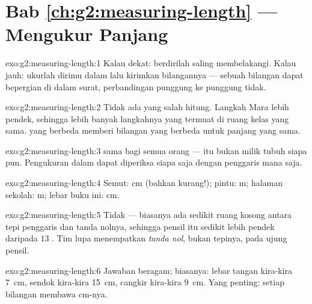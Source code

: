 \section*{Bab \ref{ch:g2:measuring-length} --- Mengukur Panjang}

\begin{solution}{exo:g2:measuring-length:1}
Kalau dekat: berdirilah saling membelakangi. Kalau jauh: ukurlah
dirimu dalam  lalu kirimkan bilangannya --- sebuah bilangan
dapat bepergian di dalam surat, perbandingan punggung ke punggung
tidak.
\end{solution}

\begin{solution}{exo:g2:measuring-length:2}
Tidak ada yang salah hitung. Langkah Mara lebih pendek, sehingga lebih
banyak langkahnya yang termuat di ruang kelas yang sama.  yang
berbeda memberi bilangan yang berbeda untuk panjang yang sama.
\end{solution}

\begin{solution}{exo:g2:measuring-length:3}
 sama bagi semua orang ---  itu bukan milik tubuh
siapa pun. Pengukuran dalam  dapat diperiksa siapa saja
dengan penggaris mana saja.
\end{solution}

\begin{solution}{exo:g2:measuring-length:4}
Semut: \unit{cm} (bahkan kurang!); pintu: \unit{m}; halaman sekolah:
\unit{m}; lebar buku ini: \unit{cm}.
\end{solution}

\begin{solution}{exo:g2:measuring-length:5}
Tidak --- biasanya ada sedikit ruang kosong antara tepi penggaris dan
tanda nolnya, sehingga pensil itu sedikit lebih pendek daripada $13$
. Tim lupa menempatkan \emph{tanda nol}, bukan tepinya, pada
ujung pensil.
\end{solution}

\begin{solution}{exo:g2:measuring-length:6}
Jawaban beragam; biasanya: lebar tangan kira-kira \qty{7}{cm}, sendok
kira-kira \qty{15}{cm}, cangkir kira-kira \qty{9}{cm}. Yang penting:
setiap bilangan membawa  \unit{cm}-nya.
\end{solution}

